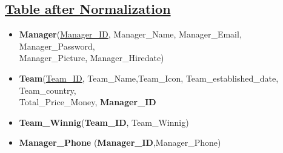 \subsection*{\underline{Table after Normalization}}
\begin{itemize}
    \item \textbf{Manager}(\underline{Manager\_ID}, Manager\_Name, Manager\_Email, Manager\_Password,\\Manager\_Picture, Manager\_Hiredate)
    \item \textbf{Team}(\underline{Team\_ID}, Team\_Name,Team\_Icon, Team\_established\_date, Team\_country,\\Total\_Price\_Money, \textbf{Manager\_ID}
    \item \textbf{Team\_Winnig}(\textbf{Team\_ID}, Team\_Winnig)
    \item \textbf{Manager\_Phone} (\textbf{Manager\_ID},{Manager\_Phone})
\end{itemize}
\clearpage